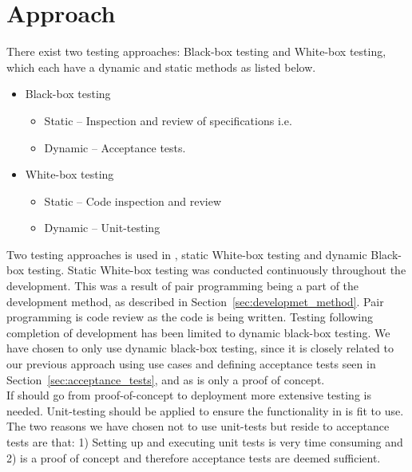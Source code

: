 \section{Approach}
\label{sec:testing_approach}
There exist two testing approaches: Black-box testing and White-box testing, which each have a dynamic and static methods as listed below.

\begin{itemize}
	\item Black-box testing
		\begin{itemize}
			\item Static -- Inspection and review of specifications i.e.
			\item Dynamic -- Acceptance tests.
		\end{itemize}

	\item White-box testing
		\begin{itemize}
			\item Static -- Code inspection and review
			\item Dynamic -- Unit-testing
		\end{itemize}
\end{itemize}

Two testing approaches is used in \projectname{}, static White-box testing and dynamic Black-box testing.
Static White-box testing was conducted continuously throughout the development.
This was a result of pair programming being a part of the development method, as described in Section~\ref{sec:developmet_method}.
Pair programming is code review as the code is being written.
Testing following completion of development has been limited to dynamic black-box testing.
We have chosen to only use dynamic black-box testing, since it is closely related to our previous approach using use cases and defining acceptance tests seen in Section~\ref{sec:acceptance_tests}, and as \projectname{} is only a proof of concept.\\

If \projectname{} should go from proof-of-concept to deployment more extensive testing is needed.
Unit-testing should be applied to ensure the functionality in \projectname{} is fit to use.
The two reasons we have chosen not to use unit-tests but reside to acceptance tests are that: 1) Setting up and executing unit tests is very time consuming and 2) \projectname{} is a proof of concept and therefore acceptance tests are deemed sufficient.\\

